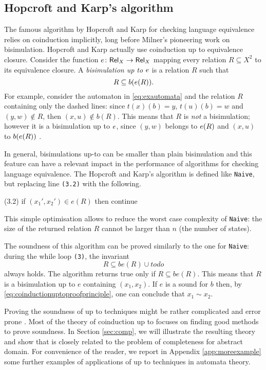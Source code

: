 \documentclass[smallcondensed,envcountsect,envcountsame]{svjour3}     %
\begin{document}
\subsection{Hopcroft and Karp's algorithm}\label{ssec:HK}

The famous algorithm by Hopcroft and Karp for checking language
equivalence~\cite{HopcroftKarp} relies on coinduction implicitly,
long before Milner's pioneering work on bisimulation. Hopcroft and Karp actually
use coinduction up to equivalence closure. Consider the function
$e\colon \mathsf{Rel}_X \to \mathsf{Rel}_X$ mapping every relation $R\subseteq X^2$
to its equivalence closure. A \emph{bisimulation up to $e$} is a
relation $R$ such that
\begin{equation*}
  \label{eq:uptoeq}
  R\subseteq b (e (R))\text{.}
\end{equation*} 
For example, consider the automaton in \eqref{eq:exautomata} and the relation $R$
containing only the dashed lines: since $t(x)(b)=y$, $t(u)(b)=w$ and
$(y,w)\notin R$, then $(x,u)\notin b(R)$. This means that $R$ is
\emph{not} a bisimulation; however it is a bisimulation up to $e$,
since $(y,w)$ belongs to $e (R)$ and $(x,u)$ to $b(e(R))$ .


In general, bisimulations up-to can be smaller than plain bisimulation
and this feature can have a relevant impact in the performance of
algorithms for checking language equivalence. The Hopcroft and Karp's algorithm is defined like \texttt{Naive}, but replacing line \texttt{(3.2)} with the following.
%
\begin{codeNT}
   (3.2)  if $(x_1',x_2')\in e(R)$ then continue
\end{codeNT}
This simple optimisation allows to reduce the worst case complexity of \texttt{Naive}: the size of the returned relation $R$ cannot be larger than $n$ (the number of states).

The soundness of this algorithm can be proved similarly to the one for  \texttt{Naive}: during the while loop \texttt{(3)}, the invariant 
 $$R\subseteq be(R) \cup todo$$
always holds. The algorithm returns true only if $R\subseteq be(R)$. This means that $R$ is a bisimulation up to $e$ containing $(x_1,x_2)$. If $e$ is a sound for $b$ then, by  \eqref{eq:coinductionuptoproofprinciple}, one can conclude that $x_1\sim x_2$. 

\medskip

Proving the soundness of up to techniques might be rather complicated and error prone \cite{}. Most of the theory of coinduction up to focuses on finding good methods to prove soundness. In Section \ref{sec:comp}, we will illustrate the resulting theory and show that is closely related to the problem of completeness for abstract domain.
For convenience of the reader, we report in Appendix \ref{app:moreexample} some further examples of applications of up to techniques in automata theory.
\end{document}
